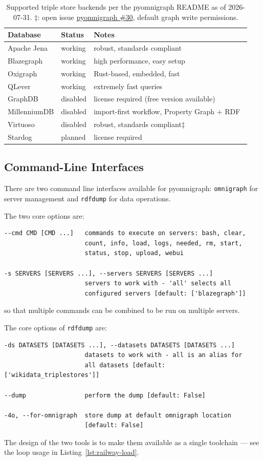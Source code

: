 \documentclass[
]{ceurart}
\begin{document}
\begin{table}
\caption{Supported triple store backends per the pyomnigraph README as of 2026-07-31.
$\ddag$: open issue \href{https://github.com/WolfgangFahl/pyomnigraph/issues/30}{pyomnigraph \#30}, default graph write permissions.}
\label{tab:backends}
\begin{tabular}{lll}
\hline
Database & Status & Notes \\
\hline
Apache Jena  & working  & robust, standards compliant \\
Blazegraph   & working  & high performance, easy setup \\
Oxigraph     & working  & Rust-based, embedded, fast \\
QLever       & working  & extremely fast queries \\
GraphDB      & disabled & license required (free version available) \\
MillenniumDB & disabled & import-first workflow, Property Graph + RDF~\cite{vrgoc2023millenniumdb} \\
Virtuoso     & disabled & robust, standards compliant$\ddag$ \\
Stardog      & planned  & license required \\
\hline
\end{tabular}
\end{table}


\subsection{Command-Line Interfaces}\label{sec:cli}
There are two command line interfaces available for pyomnigraph: \texttt{omnigraph} for server management and \texttt{rdfdump} for data operations.

The two core options are:
\begin{lstlisting}[caption={omnigraph core options},label={lst:omnigraph-options}]
--cmd CMD [CMD ...]   commands to execute on servers: bash, clear,
                      count, info, load, logs, needed, rm, start,
                      status, stop, upload, webui

-s SERVERS [SERVERS ...], --servers SERVERS [SERVERS ...]
                      servers to work with - 'all' selects all
                      configured servers [default: ['blazegraph']]
\end{lstlisting}
so that multiple commands can be combined to be run on multiple servers.

The core options of \texttt{rdfdump} are:
\begin{lstlisting}[caption={rdfdump core options},label={lst:rdfdump-options}]
-ds DATASETS [DATASETS ...], --datasets DATASETS [DATASETS ...]
                      datasets to work with - all is an alias for
                      all datasets [default: ['wikidata_triplestores']]

--dump                perform the dump [default: False]

-4o, --for-omnigraph  store dump at default omnigraph location
                      [default: False]
\end{lstlisting}
The design of the two tools is to make them available as a single
toolchain --- see the loop usage in Listing~\ref{lst:railway-load}.
\end{document}
